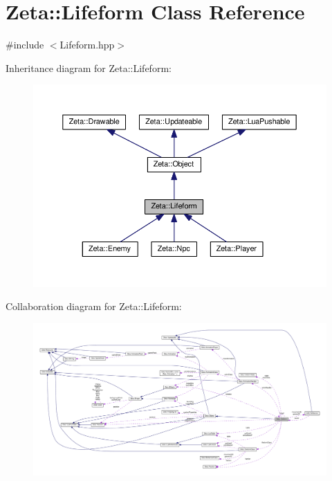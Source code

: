 \hypertarget{classZeta_1_1Lifeform}{\section{Zeta\+:\+:Lifeform Class Reference}
\label{classZeta_1_1Lifeform}
}


{\ttfamily \#include $<$Lifeform.\+hpp$>$}



Inheritance diagram for Zeta\+:\+:Lifeform\+:\nopagebreak
\begin{figure}[H]
\begin{center}
\leavevmode
\includegraphics[width=350pt]{classZeta_1_1Lifeform__inherit__graph}
\end{center}
\end{figure}


Collaboration diagram for Zeta\+:\+:Lifeform\+:
\nopagebreak
\begin{figure}[H]
\begin{center}
\leavevmode
\includegraphics[width=350pt]{classZeta_1_1Lifeform__coll__graph}
\end{center}
\end{figure}

